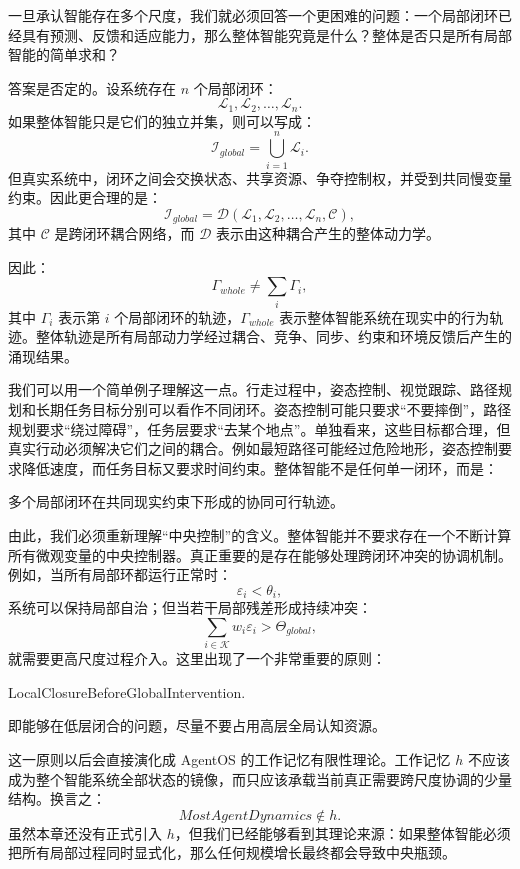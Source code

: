 一旦承认智能存在多个尺度，我们就必须回答一个更困难的问题：一个局部闭环已经具有预测、反馈和适应能力，那么整体智能究竟是什么？整体是否只是所有局部智能的简单求和？

答案是否定的。设系统存在 $n$ 个局部闭环：
\[
\mathcal{L}_1,\mathcal{L}_2,\ldots,\mathcal{L}_n.
\]
如果整体智能只是它们的独立并集，则可以写成：
\[
\mathcal{I}_{global}
=
\bigcup_{i=1}^{n}\mathcal{L}_i.
\]
但真实系统中，闭环之间会交换状态、共享资源、争夺控制权，并受到共同慢变量约束。因此更合理的是：
\[
\mathcal{I}_{global}
=
\mathcal{D}
\left(
\mathcal{L}_1,
\mathcal{L}_2,
\ldots,
\mathcal{L}_n,
\mathcal{C}
\right),
\]
其中 $\mathcal{C}$ 是跨闭环耦合网络，而 $\mathcal{D}$ 表示由这种耦合产生的整体动力学。

因此：
\[
\boxed{
\Gamma_{whole}
\neq
\sum_i\Gamma_i,
}
\]
其中 $\Gamma_i$ 表示第 $i$ 个局部闭环的轨迹，$\Gamma_{whole}$ 表示整体智能系统在现实中的行为轨迹。整体轨迹是所有局部动力学经过耦合、竞争、同步、约束和环境反馈后产生的涌现结果。

我们可以用一个简单例子理解这一点。行走过程中，姿态控制、视觉跟踪、路径规划和长期任务目标分别可以看作不同闭环。姿态控制可能只要求“不要摔倒”，路径规划要求“绕过障碍”，任务层要求“去某个地点”。单独看来，这些目标都合理，但真实行动必须解决它们之间的耦合。例如最短路径可能经过危险地形，姿态控制要求降低速度，而任务目标又要求时间约束。整体智能不是任何单一闭环，而是：
\begin{statementbox}
多个局部闭环在共同现实约束下形成的协同可行轨迹。
\end{statementbox}

由此，我们必须重新理解“中央控制”的含义。整体智能并不要求存在一个不断计算所有微观变量的中央控制器。真正重要的是存在能够处理跨闭环冲突的协调机制。例如，当所有局部环都运行正常时：
\[
\varepsilon_i<\theta_i,
\]
系统可以保持局部自治；但当若干局部残差形成持续冲突：
\[
\sum_{i\in\mathcal{K}}
w_i\varepsilon_i
>
\Theta_{global},
\]
就需要更高尺度过程介入。这里出现了一个非常重要的原则：
\begin{statementbox}
LocalClosureBeforeGlobalIntervention.
\end{statementbox}
即能够在低层闭合的问题，尽量不要占用高层全局认知资源。

这一原则以后会直接演化成 AgentOS 的工作记忆有限性理论。工作记忆 $h$ 不应该成为整个智能系统全部状态的镜像，而只应该承载当前真正需要跨尺度协调的少量结构。换言之：
\[
\boxed{
MostAgentDynamics\notin h.
}
\]
虽然本章还没有正式引入 $h$，但我们已经能够看到其理论来源：如果整体智能必须把所有局部过程同时显式化，那么任何规模增长最终都会导致中央瓶颈。

